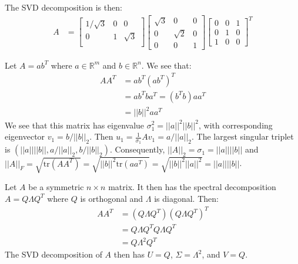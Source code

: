 \documentclass{article}
\begin{document}
The SVD decomposition is then:
\begin{align*}
    A & = \begin{bmatrix}
        1/\sqrt{3} & 0 & 0 \\ 0 & 1 & \sqrt{3} \\ 
    \end{bmatrix}\begin{bmatrix}
        \sqrt{3} & 0 & 0 \\ 0 & \sqrt{2} & 0 \\ 0 & 0 & 1 
    \end{bmatrix}\begin{bmatrix}
        0 & 0 & 1 \\ 0 & 1 & 0 \\ 1 & 0 & 0
    \end{bmatrix}^T
\end{align*}

\clearpage
\problem{}
Let $A = ab^T$ where $a \in \mathbb{R}^m$ and $b \in \mathbb{R}^n$.
We see that:
\begin{align*}
    AA^T & = ab^T{(ab^T)}^T \\
    & = ab^Tba^T = (b^Tb)aa^T \\
    & = ||b||^2 aa^T
\end{align*}
We see that this matrix has eigenvalue $\sigma_1^2 = ||a||^2||b||^2$, with corresponding eigenvector $v_1 = b/||b||_2$. Then $u_1 = \frac{1}{\sigma_1}Av_1 = a/||a||_2$. The largest singular triplet is $(||a||||b||, a/||a||_2, b/||b||_2)$.
Consequently, $||A||_2 = \sigma_1 = ||a||||b||$ and $||A||_F = \sqrt{\mathrm{tr}(AA^T)} = \sqrt{||b||^2\mathrm{tr}(aa^T)} = \sqrt{||b||^2||a||^2} = ||a||||b||$.

\clearpage
\problem{}
Let $A$ be a symmetric $n \times n$ matrix. It then has the spectral decomposition $A = Q\Lambda Q^T$ where $Q$ is orthogonal and $\Lambda$ is diagonal. Then:
\begin{align*}
    AA^T & = (Q\Lambda Q^T)(Q\Lambda Q^T)^T \\
    & = Q\Lambda Q^TQ\Lambda Q^T \\
    & = Q\Lambda^2 Q^T
\end{align*}
The SVD decomposition of $A$ then has $U = Q$, $\Sigma = \Lambda^2$, and $V = Q$.
\end{document}
